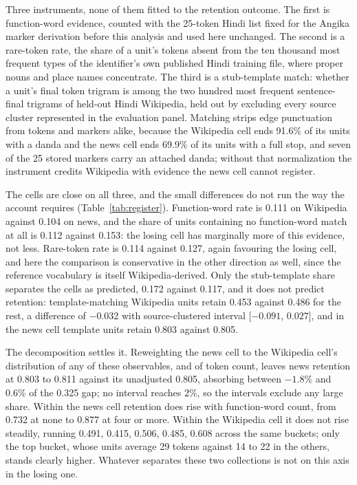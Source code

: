 \documentclass[final]{clv2025}
\begin{document}
Three instruments, none of them fitted to the retention outcome. The first is function-word evidence, counted with the 25-token Hindi list fixed for the Angika marker derivation before this analysis and used here unchanged. The second is a rare-token rate, the share of a unit's tokens absent from the ten thousand most frequent types of the identifier's own published Hindi training file, where proper nouns and place names concentrate. The third is a stub-template match: whether a unit's final token trigram is among the two hundred most frequent sentence-final trigrams of held-out Hindi Wikipedia, held out by excluding every source cluster represented in the evaluation panel. Matching strips edge punctuation from tokens and markers alike, because the Wikipedia cell ends 91.6\% of its units with a danda and the news cell ends 69.9\% of its units with a full stop, and seven of the 25 stored markers carry an attached danda; without that normalization the instrument credits Wikipedia with evidence the news cell cannot register.

The cells are close on all three, and the small differences do not run the way the account requires (Table~\ref{tab:register}). Function-word rate is 0.111 on Wikipedia against 0.104 on news, and the share of units containing no function-word match at all is 0.112 against 0.153: the losing cell has marginally more of this evidence, not less. Rare-token rate is 0.114 against 0.127, again favouring the losing cell, and here the comparison is conservative in the other direction as well, since the reference vocabulary is itself Wikipedia-derived. Only the stub-template share separates the cells as predicted, 0.172 against 0.117, and it does not predict retention: template-matching Wikipedia units retain 0.453 against 0.486 for the rest, a difference of $-0.032$ with source-clustered interval [$-0.091$, $0.027$], and in the news cell template units retain 0.803 against 0.805.

The decomposition settles it. Reweighting the news cell to the Wikipedia cell's distribution of any of these observables, and of token count, leaves news retention at 0.803 to 0.811 against its unadjusted 0.805, absorbing between $-1.8\%$ and $0.6\%$ of the 0.325 gap; no interval reaches $2\%$, so the intervals exclude any large share. Within the news cell retention does rise with function-word count, from 0.732 at none to 0.877 at four or more. Within the Wikipedia cell it does not rise steadily, running 0.491, 0.415, 0.506, 0.485, 0.608 across the same buckets; only the top bucket, whose units average 29 tokens against 14 to 22 in the others, stands clearly higher. Whatever separates these two collections is not on this axis in the losing one.
\end{document}
